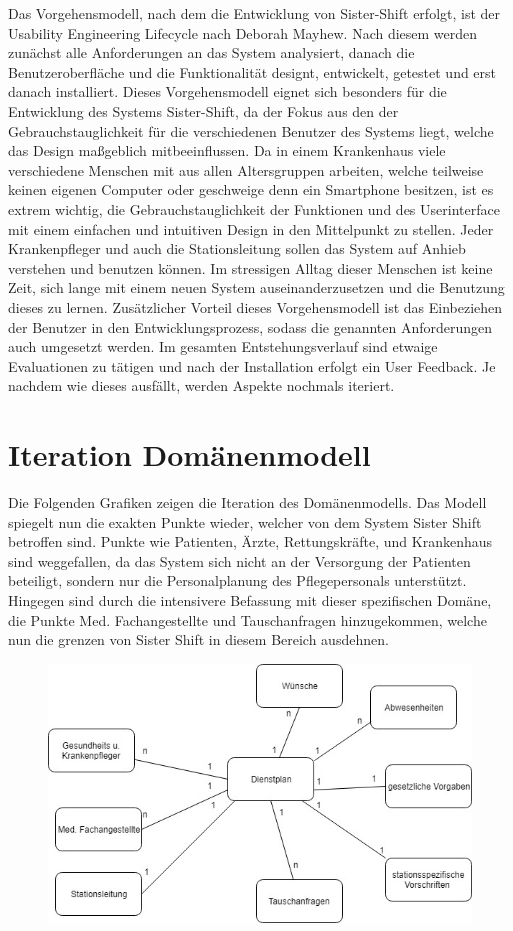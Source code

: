 \documentclass[11pt,
paper=a4,
bibtotocnumbered,	  %
liststotocnumbered,  %
DIV=calc,		  %
tablecaptionabove,	  %
headinclude,
]{article}
\begin{document}
Das Vorgehensmodell, nach dem die Entwicklung von Sister-Shift erfolgt, ist der Usability Engineering Lifecycle nach Deborah Mayhew. Nach diesem werden zunächst alle Anforderungen an das System analysiert, danach die Benutzeroberfläche und die Funktionalität designt, entwickelt, getestet und erst danach installiert. Dieses Vorgehensmodell eignet sich besonders für die Entwicklung des Systems Sister-Shift, da der Fokus aus den der Gebrauchstauglichkeit für die verschiedenen Benutzer des Systems liegt, welche das Design maßgeblich mitbeeinflussen. Da in einem Krankenhaus viele verschiedene Menschen mit aus allen Altersgruppen arbeiten, welche teilweise keinen eigenen Computer oder geschweige denn ein Smartphone besitzen, ist es extrem wichtig, die Gebrauchstauglichkeit der Funktionen und des Userinterface mit einem einfachen und intuitiven Design in den Mittelpunkt zu stellen. Jeder Krankenpfleger und auch die Stationsleitung sollen das System auf Anhieb verstehen und benutzen können. Im stressigen Alltag dieser Menschen ist keine Zeit, sich lange mit einem neuen System auseinanderzusetzen und die Benutzung dieses zu lernen. Zusätzlicher Vorteil dieses Vorgehensmodell ist das Einbeziehen der Benutzer in den Entwicklungsprozess, sodass die genannten Anforderungen auch umgesetzt werden. Im gesamten Entstehungsverlauf sind etwaige Evaluationen zu tätigen und nach der Installation erfolgt ein User Feedback. Je nachdem wie dieses ausfällt, werden Aspekte nochmals iteriert.

\section{Iteration Domänenmodell}
Die Folgenden Grafiken zeigen die Iteration des Domänenmodells. Das Modell spiegelt nun die exakten Punkte wieder, welcher von dem System Sister Shift betroffen sind. Punkte wie Patienten, Ärzte, Rettungskräfte, und Krankenhaus sind weggefallen, da das System sich nicht an der Versorgung der Patienten beteiligt, sondern nur die Personalplanung des Pflegepersonals unterstützt. Hingegen sind durch die intensivere Befassung mit dieser spezifischen Domäne, die Punkte Med. Fachangestellte und Tauschanfragen hinzugekommen, welche nun die grenzen von Sister Shift in diesem Bereich ausdehnen. 

\begin{figure}
\includegraphics[scale=1]{Bilder/Domaenenmodell.jpg}
\end{figure}
\end{document}
